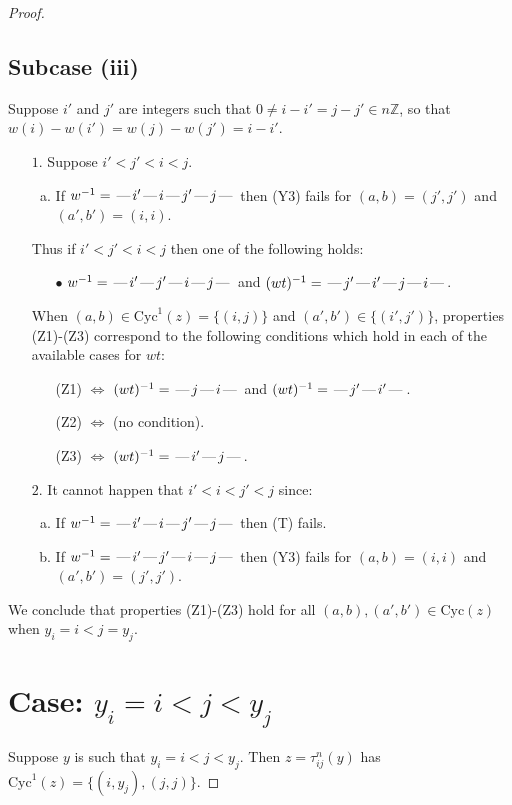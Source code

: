 \documentclass[10pt]{article}
\theoremstyle{definition}
\theoremstyle{definition}
\def\dash{\text{\hspace{0.5mm}---\hspace{0.5mm}}}
\def\Cyc{\mathrm{Cyc}}
\def\ZZ{\mathbb{Z}}
\begin{document}
\begin{proof}
\subsection{Subcase (iii)}
Suppose $i'$ and $j'$ are integers such that
$0\neq i - i' = j - j' \in n\ZZ$,
so that $w(i) - w(i') = w(j) - w(j') = i - i'$.
\begin{enumerate}
\item[$1$.] Suppose $i' < j' < i < j$.
\begin{enumerate}[(a)]
\item If $w^{-1} = \dash i'\dash i\dash j'\dash j\dash $ then (Y3) fails for $(a,b)=(j',j')$ and $(a',b')=(i,i)$.
\end{enumerate}
Thus if $i' < j' < i < j$ then one of the following holds:
\begin{enumerate}
\item[$\bullet$] $w^{-1} = \dash i'\dash j'\dash i\dash j\dash $ and $(wt)^{-1} = \dash j'\dash i'\dash j\dash i\dash $.
\end{enumerate}
When $(a,b)\in\Cyc^1(z)=\{(i,j)\}$ and $(a',b')\in\{(i',j')\}$,
properties (Z1)-(Z3) correspond to the following conditions which
hold in each of the available cases for $wt$:
\begin{enumerate}
\item[](Z1) $\Leftrightarrow$ $(wt)^{-1} = \dash j \dash i \dash$  and $(wt)^{-1} = \dash j' \dash i' \dash$.
\item[](Z2) $\Leftrightarrow$ (no condition).
\item[](Z3) $\Leftrightarrow$ $(wt)^{-1} = \dash i' \dash j \dash$.
\end{enumerate}
\item[$2$.] It cannot happen that $i' < i < j' < j$ since:
\begin{enumerate}[(a)]
\item If $w^{-1} = \dash i'\dash i\dash j'\dash j\dash $ then (T) fails.
\item If $w^{-1} = \dash i'\dash j'\dash i\dash j\dash $ then (Y3) fails for $(a,b)=(i,i)$ and $(a',b')=(j',j')$.
\end{enumerate}
\end{enumerate}
We conclude that properties (Z1)-(Z3) hold for all 
$(a,b),(a',b') \in \Cyc(z)$ when $y_i = i < j = y_j$.
\section{Case: $y_i = i < j < y_j$}
Suppose $y$ is such that $y_i = i < j < y_j$.
Then $z = \tau^n_{ij}(y)$ has $\Cyc^1(z) = \{(i,y_j),(j,j)\}.$

\end{proof}
\end{document}
